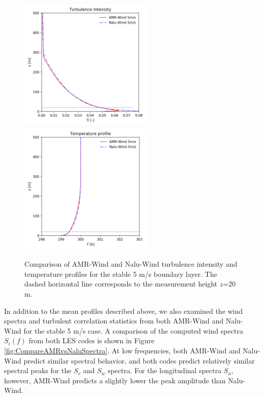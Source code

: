 \begin{figure} [hbt!]
  \centering
  \includegraphics[width=2.5in]{figures/Compare_AMRWind_NaluWind/AMRWind_NaluWind_stable_05ms_mesh2p5_2p5_2p5_TI.png}
  \includegraphics[width=2.5in]{figures/Compare_AMRWind_NaluWind/AMRWind_NaluWind_stable_05ms_mesh2p5_2p5_2p5_T.png}
  \caption{\label{fig:CompareAMRvsNaluWind_TTI} Comparison of AMR-Wind
    and Nalu-Wind turbulence intensity and temperature profiles for
    the stable 5 m/s boundary layer. The dashed horizontal line
    corresponds to the measurement height $z$=20 m.}
\end{figure}

In addition to the mean profiles described above, we also examined the
wind spectra and turbulent correlation statistics from both AMR-Wind
and Nalu-Wind for the stable 5 m/s case.  A comparison of the computed
wind spectra $S_i(f)$ from both LES codes is shown in Figure
\ref{fig:CompareAMRvsNaluSpectra}.  At low frequencies, both AMR-Wind
and Nalu-Wind predict similar spectral behavior, and both codes
predict relatively similar spectral peaks for the $S_v$ and $S_w$
spectra.  For the longitudinal spectra $S_u$, however, AMR-Wind
predicts a slightly lower the peak amplitude than Nalu-Wind.

